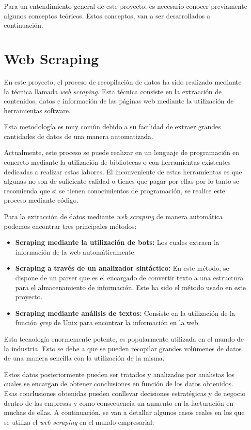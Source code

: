 Para un entendimiento general de este proyecto, es necesario conocer previamente algunos conceptos teóricos. Estos conceptos, van a ser desarrollados a continuación. 

\section{Web Scraping}
En este proyecto, el proceso de recopilación de datos ha sido realizado mediante la técnica llamada \textit{web scraping}. Esta técnica consiste en la extracción de contenidos, datos e información de las páginas web mediante la utilización de herramientas software.

Esta metodología es muy común debido a su facilidad de extraer grandes cantidades de datos de una manera automatizada.

Actualmente, este proceso se puede realizar en un lenguaje de programación en concreto mediante la utilización de bibliotecas o con herramientas existentes dedicadas a realizar estas labores. El inconveniente de estas herramientas es que algunas no son de suficiente calidad o tienes que pagar por ellas por lo tanto se recomienda que si se tienen conocimientos de programación, se realice este proceso mediante código. 

Para la extracción de datos mediante \textit{web scraping} de manera automática podemos encontrar tres principales métodos:
\begin{itemize}
    \item \textbf{Scraping mediante la utilización de bots:} Los cuales extraen la información de la web automáticamente.
    \item \textbf{Scraping a través de un analizador sintáctico:} En este método, se dispone de un parser que es el encargado de convertir texto a una estructura para el almacenamiento de información. Este ha sido el método usado en este proyecto.
    \item \textbf{Scraping mediante análisis de textos:} Consiste en la utilización de la función \textit{grep} de Unix para encontrar la información en la web.
\end{itemize}

Esta tecnología enormemente potente, es popularmente utilizada en el mundo de la industria. Esto se debe a que se pueden recopilar grandes volúmenes de datos de una manera sencilla con la utilización de la misma.
    
Estos datos posteriormente pueden ser tratados y analizados por analistas los cuales se encargan de obtener conclusiones en función de los datos obtenidos. Esas conclusiones obtenidas pueden conllevar decisiones estratégicas y de negocio dentro de las empresas y como consecuencia un aumento en la facturación en muchas de ellas. A continuación, se van a detallar algunos casos reales en los que se utiliza el \textit{web scraping} en el mundo empresarial:

